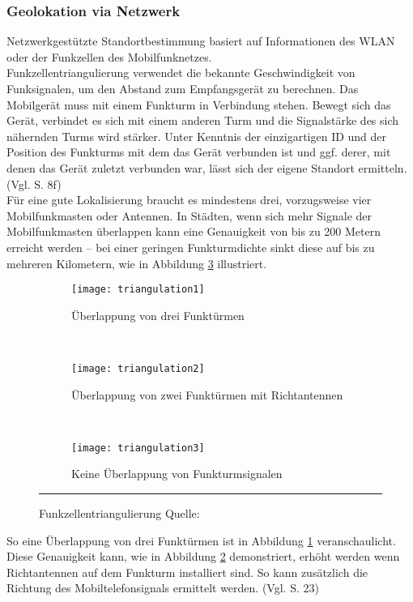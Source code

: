 \subsubsection{Geolokation via Netzwerk}
Netzwerkgestützte Standortbestimmung basiert auf Informationen des \gls{WLAN} oder der Funkzellen des Mobilfunknetzes.\\ 
Funkzellentriangulierung verwendet die bekannte Geschwindigkeit von Funksignalen, um den Abstand zum Empfangsgerät zu berechnen. Das Mobilgerät muss mit einem Funkturm in Verbindung stehen. Bewegt sich das Gerät, verbindet es sich mit einem anderen Turm und die Signalstärke des sich nähernden Turms wird stärker. Unter Kenntnis der einzigartigen ID und der Position des Funkturms mit dem das Gerät verbunden ist und ggf. derer, mit denen das Gerät zuletzt verbunden war, lässt sich der eigene Standort ermitteln. (Vgl. \cite{location} S. 8f) \\
Für eine gute Lokalisierung braucht es mindestens drei, vorzugsweise vier Mobilfunkmasten oder Antennen. In Städten, wenn sich mehr Signale der Mobilfunkmasten überlappen kann eine Genauigkeit von bis zu 200 Metern erreicht werden -- bei einer geringen Funkturmdichte sinkt diese auf bis zu mehreren Kilometern, wie in Abbildung \ref{fig:cell3} illustriert. 
\begin{figure}[H]
        \centering
        \begin{subfigure}[t]{0.23\textwidth}
                \texttt{[image: triangulation1]}
                \caption{Überlappung von drei Funktürmen}
                \label{fig:cell1}
        \end{subfigure}
        ~ 
        \begin{subfigure}[t]{0.23\textwidth}
                \texttt{[image: triangulation2]}
                \caption{Überlappung von zwei Funktürmen mit Richtantennen}
                \label{fig:cell2}
        \end{subfigure}
         ~ 
        \begin{subfigure}[t]{0.23\textwidth}
                \texttt{[image: triangulation3]}
                \caption{Keine Überlappung von Funkturmsignalen}
                \label{fig:cell3}
        \end{subfigure}
        \rule{35em}{0.5pt}
        \caption[Funkzellentriangulierung]{Funkzellentriangulierung Quelle: \cite{fig:cell}}
        \label{fig:cell}
\end{figure}
So eine Überlappung von drei Funktürmen ist in Abbildung \ref{fig:cell1} veranschaulicht. Diese Genauigkeit kann, wie in Abbildung \ref{fig:cell2} demonstriert, erhöht werden wenn Richtantennen auf dem Funkturm installiert sind. So kann zusätzlich die Richtung des Mobiltelefonsignals ermittelt werden. (Vgl. \cite{gps} S. 23) \\\\
